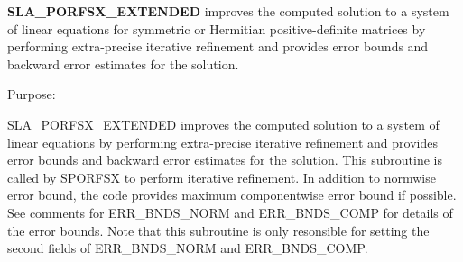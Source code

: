 {\bfseries S\+L\+A\+\_\+\+P\+O\+R\+F\+S\+X\+\_\+\+E\+X\+T\+E\+N\+D\+E\+D} improves the computed solution to a system of linear equations for symmetric or Hermitian positive-\/definite matrices by performing extra-\/precise iterative refinement and provides error bounds and backward error estimates for the solution. 

 \begin{DoxyParagraph}{Purpose\+: }
\begin{DoxyVerb} SLA_PORFSX_EXTENDED improves the computed solution to a system of
 linear equations by performing extra-precise iterative refinement
 and provides error bounds and backward error estimates for the solution.
 This subroutine is called by SPORFSX to perform iterative refinement.
 In addition to normwise error bound, the code provides maximum
 componentwise error bound if possible. See comments for ERR_BNDS_NORM
 and ERR_BNDS_COMP for details of the error bounds. Note that this
 subroutine is only resonsible for setting the second fields of
 ERR_BNDS_NORM and ERR_BNDS_COMP.\end{DoxyVerb}
 
\end{DoxyParagraph}

